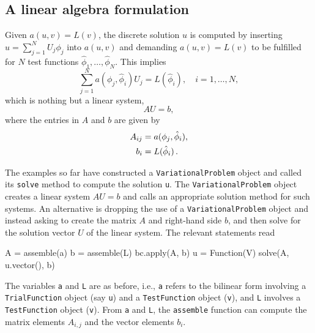 \subsection{A linear algebra formulation}
\label{langtangen:poisson1:linalg}

Given $a(u,v)=L(v)$, the discrete solution $u$ is computed by
inserting $u=\sum_{j=1}^N U_j \phi_j$ into $a(u,v)$ and demanding
$a(u,v)=L(v)$ to be fulfilled for $N$ test functions
$\hat\phi_1,\ldots,\hat\phi_N$. This implies
\[ \sum_{j=1}^N a(\phi_j,\hat\phi_i) U_j = L(\hat\phi_i),\quad i=1,\ldots,N,\]
which is nothing but a linear system,
\begin{displaymath}
  AU = b,
\end{displaymath}
where the entries in $A$ and $b$ are given by
\begin{displaymath}
\begin{split}
  A_{ij} &= a(\phi_j, \hat{\phi}_i), \\
  b_i &= L(\hat\phi_i)\thinspace .
\end{split}
\end{displaymath}

The examples so far have constructed a {\fontsize{10pt}{10pt}\verb!VariationalProblem!} object
and called its {\fontsize{10pt}{10pt}\verb!solve!} method to compute the solution 
{\fontsize{10pt}{10pt}\verb!u!}. 
The {\fontsize{10pt}{10pt}\texttt{VariationalProblem}} object creates a linear system
$AU=b$ and calls an appropriate solution method for such systems.
An alternative is dropping the use of a {\fontsize{10pt}{10pt}\texttt{VariationalProblem}}
object and instead asking
\fenics{} to create the matrix $A$
and right-hand side $b$, and then solve for the
solution vector $U$ of the linear system.
The relevant statements read
\begin{python}
A = assemble(a)
b = assemble(L)
bc.apply(A, b)
u = Function(V)
solve(A, u.vector(), b)
\end{python}
The variables {\fontsize{10pt}{10pt}\texttt{a}} and {\fontsize{10pt}{10pt}\texttt{L}} are as before, i.e., {\fontsize{10pt}{10pt}\texttt{a}} refers to the
bilinear form involving a {\fontsize{10pt}{10pt}\texttt{TrialFunction}} object (say {\fontsize{10pt}{10pt}\texttt{u}})
and a {\fontsize{10pt}{10pt}\texttt{TestFunction}} object ({\fontsize{10pt}{10pt}\texttt{v}}), and {\fontsize{10pt}{10pt}\texttt{L}} involves a
{\fontsize{10pt}{10pt}\texttt{TestFunction}} object ({\fontsize{10pt}{10pt}\texttt{v}}). From {\fontsize{10pt}{10pt}\texttt{a}} and {\fontsize{10pt}{10pt}\texttt{L}},
the {\fontsize{10pt}{10pt}\texttt{assemble}} function can
compute the matrix elements $A_{i,j}$ and the vector elements $b_i$.


